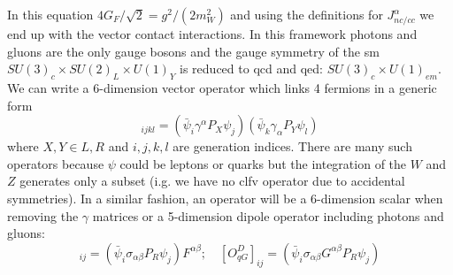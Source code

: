 \begin{refsection}
\begin{equation}
        \end{equation}
        In this equation $4G_F/\sqrt{2}=g^2/(2m_W^2)$ and using the definitions for $J_{nc/cc}^\alpha$ we end up with the vector contact interactions.
        In this framework photons and gluons are the only gauge bosons and the gauge symmetry of the \gls{sm} $SU(3)_c\times SU(2)_L\times U(1)_Y$ is reduced to \gls{qcd} and \gls{qed}: $SU(3)_c\times U(1)_{em}$.
        We can write a 6-dimension vector operator which links 4 fermions in a generic form
        \begin{equation}
            [O^{XY}_{f}]_{ijkl}=(\bar{\psi}_i\gamma^\alpha P_X \psi_j)(\bar{\psi}_k\gamma_\alpha P_Y \psi_l)
        \end{equation}
        where $X,Y \in {L,R}$ and ${i,j,k,l}$ are generation indices. There are many such operators because $\psi$ could be leptons or quarks but the integration of the $W$ and $Z$ generates only a subset (i.g. we have no \gls{clfv} operator due to accidental symmetries).
        In a similar fashion, an operator will be a 6-dimension scalar when removing the $\gamma$ matrices or a 5-dimension dipole operator including photons and gluons:
        \begin{equation}
            [O^D_{f\gamma}]_{ij}=(\bar{\psi}_i\sigma_{\alpha\beta}P_R\psi_j)F^{\alpha\beta};
            \quad
            [O^D_{qG}]_{ij}=(\bar{\psi}_i\sigma_{\alpha\beta}G^{\alpha\beta}P_R\psi_j)
        \end{equation}
        

\end{refsection}
